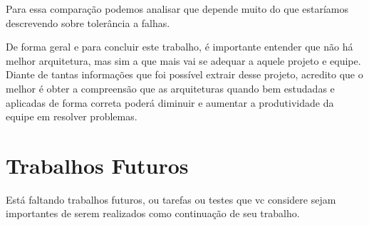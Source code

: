 Para essa comparação podemos analisar que depende muito do que estaríamos descrevendo sobre tolerância a falhas.

De forma geral e para concluir este trabalho, é importante entender que não há melhor arquitetura, mas sim a que mais vai se adequar a aquele projeto e equipe. Diante de tantas informações que foi possível extrair desse projeto, acredito que o melhor é obter a compreensão que as arquiteturas quando bem estudadas e aplicadas de forma correta poderá diminuir e aumentar a produtividade da equipe em resolver problemas.


\section{Trabalhos Futuros}
Está faltando trabalhos futuros, ou tarefas ou testes que vc considere sejam importantes de serem realizados como continuação de seu trabalho.





